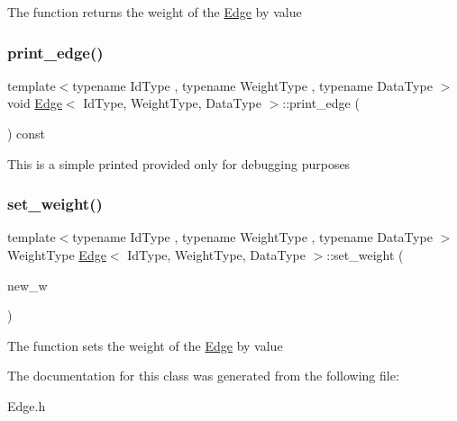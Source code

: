 The function returns the weight of the \hyperlink{class_edge}{Edge} by value \mbox{\label{class_edge_acfcab535ffd0b064765fb2096633c246}} 
\subsubsection{\texorpdfstring{print\+\_\+edge()}{print\_edge()}}
{\footnotesize\ttfamily template$<$typename Id\+Type , typename Weight\+Type , typename Data\+Type $>$ \\
void \hyperlink{class_edge}{Edge}$<$ Id\+Type, Weight\+Type, Data\+Type $>$\+::print\+\_\+edge (\begin{DoxyParamCaption}{ }\end{DoxyParamCaption}) const\hspace{0.3cm}{\ttfamily [inline]}}

This is a simple printed provided only for debugging purposes \mbox{\label{class_edge_a71ab746404c0b7141b80f07e8e2e8837}} 
\subsubsection{\texorpdfstring{set\+\_\+weight()}{set\_weight()}}
{\footnotesize\ttfamily template$<$typename Id\+Type , typename Weight\+Type , typename Data\+Type $>$ \\
Weight\+Type \hyperlink{class_edge}{Edge}$<$ Id\+Type, Weight\+Type, Data\+Type $>$\+::set\+\_\+weight (\begin{DoxyParamCaption}\item[{Weight\+Type}]{new\+\_\+w }\end{DoxyParamCaption})\hspace{0.3cm}{\ttfamily [inline]}}

The function sets the weight of the \hyperlink{class_edge}{Edge} by value 

The documentation for this class was generated from the following file\+:\begin{DoxyCompactItemize}
\item 
Edge.\+h\end{DoxyCompactItemize}
